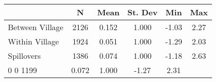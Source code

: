 \begin{tabular}{l*{5}{c}}\hline&\multicolumn{1}{c}{N}&\multicolumn{1}{c}{Mean}&\multicolumn{1}{c}{St. Dev}&\multicolumn{1}{c}{Min}&\multicolumn{1}{c}{Max}\\ \hline 
Between Village & 2126 & 0.152 & 1.000 & -1.03 & 2.27 \\
Within Village & 1924 & 0.051 & 1.000 & -1.29 & 2.03 \\
Spillovers & 1386 & 0.074 & 1.000 & -1.18 & 2.63 \\
0 0 1199 & 0.072 & 1.000 & -1.27 & 2.31 \\
\hline \end{tabular}
